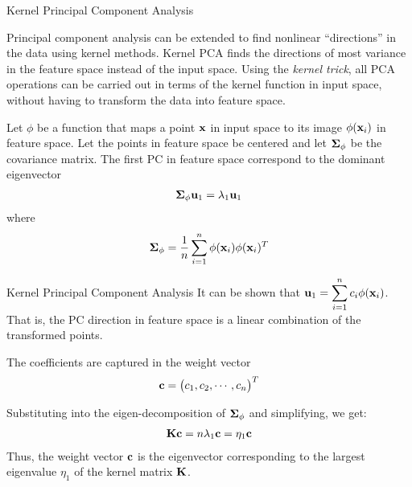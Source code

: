\begin{frame}{Kernel Principal Component Analysis}

Principal component analysis can be extended to f\/{i}nd nonlinear
``directions'' in the data using kernel methods.
Kernel PCA f\/{i}nds the directions of most
variance in the feature space instead of the input space.  
Using the {\em kernel trick}, all PCA operations 
can be carried out in terms
of the kernel function in input space, without having to transform the
data into feature space.


\bigskip
Let $\phi$ be a function that maps a point
$\mathbf{x}$ in input space to its image $\phi(\mathbf{x}_i)$ in feature space. 
Let the points in
feature space be centered and let ${\bm \Sigma}_\phi$ be the covariance matrix. 
The first PC in feature space correspond to the dominant eigenvector
\begin{align*}
  {\bm \Sigma}_\phi \mathbf{u}_1 = \lambda_1 \mathbf{u}_1
\end{align*}
  where
\begin{align*}
  {\bm \Sigma}_\phi = {1\over n}\displaystyle \sum_{i=1}^n \phi(\mathbf{x}_i) \phi(\mathbf{x}_i)^T
\end{align*}

\end{frame}

\begin{frame}{Kernel Principal Component Analysis}
It can be shown that $\mathbf{u}_1 = \displaystyle \sum_{i=1}^n c_{i} \phi(\mathbf{x}_i)$.
That is, the PC direction in 
feature space is a linear combination
of the transformed points. 

\medskip
The coefficients are captured in the weight vector
$$\mathbf{c} = \begin{pmatrix} c_1, c_2, \cdots, c_n \end{pmatrix}^T$$

\medskip
Substituting into the eigen-decomposition of ${\bm \Sigma}_\phi$ and
simplifying, we get:
\begin{align*}
  \mathbf{K}\mathbf{c} = n \lambda_1 \mathbf{c} = \eta_1 \mathbf{c}
\end{align*}
Thus,
the weight vector $\mathbf{c}$ is the eigenvector
corresponding to the
largest eigenvalue $\eta_1$ of the kernel matrix
$\mathbf{K}$.
\end{frame}


